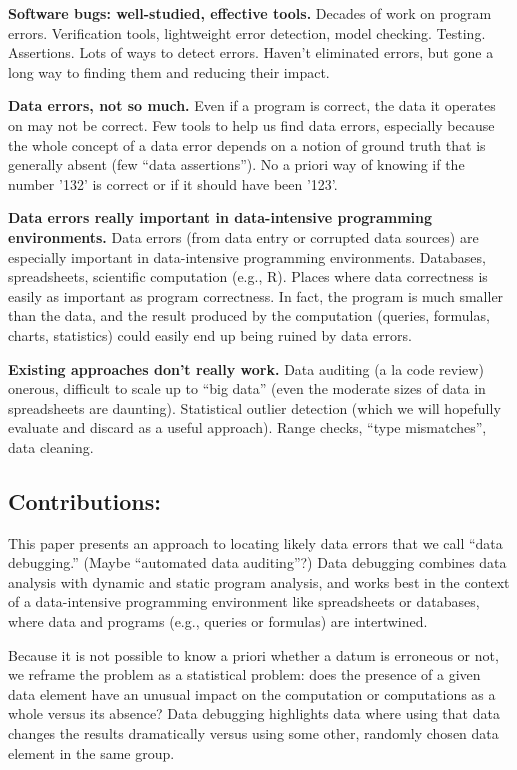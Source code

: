 \textbf{Software bugs: well-studied, effective tools.}
Decades of work on program errors. Verification tools, lightweight
error detection, model checking. Testing. Assertions. Lots of ways to
detect errors. Haven't eliminated errors, but gone a long way to
finding them and reducing their impact.

\textbf{Data errors, not so much.}
Even if a program is correct, the data it operates on may not be
correct.  Few tools to help us find data errors, especially because
the whole concept of a data error depends on a notion of ground truth
that is generally absent (few ``data assertions''). No a priori way of
knowing if the number '132' is correct or if it should have been
'123'.

\textbf{Data errors really important in data-intensive programming environments.}
Data errors (from data entry or corrupted data sources) are especially
important in data-intensive programming environments.  Databases,
spreadsheets, scientific computation (e.g., R). Places where data
correctness is easily as important as program correctness.  In fact,
the program is much smaller than the data, and the result produced by
the computation (queries, formulas, charts, statistics) could easily
end up being ruined by data errors.

\textbf{Existing approaches don't really work.}
Data auditing (a la code review) onerous, difficult to scale up to
``big data'' (even the moderate sizes of data in spreadsheets are
daunting). Statistical outlier detection (which we will hopefully
evaluate and discard as a useful approach). Range checks, ``type
mismatches'', data cleaning.

\subsection*{Contributions:}

This paper presents an approach to locating likely data errors that we
call ``data debugging.'' (Maybe ``automated data auditing''?) Data
debugging combines data analysis with dynamic and static program
analysis, and works best in the context of a data-intensive
programming environment like spreadsheets or databases, where data and
programs (e.g., queries or formulas) are intertwined.

Because it is not possible to know a priori whether a datum is
erroneous or not, we reframe the problem as a statistical problem:
does the presence of a given data element have an unusual impact on
the computation or computations as a whole versus its absence? Data
debugging highlights data where using that data changes the
results dramatically versus using some other, randomly chosen data
element in the same group.


